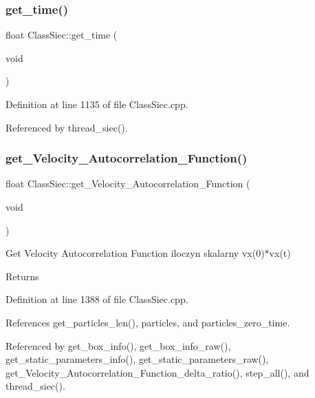 \subsubsection{\texorpdfstring{get\+\_\+time()}{get\_time()}}
{\footnotesize\ttfamily float Class\+Siec\+::get\+\_\+time (\begin{DoxyParamCaption}\item[{void}]{ }\end{DoxyParamCaption})}



Definition at line 1135 of file Class\+Siec.\+cpp.



Referenced by thread\+\_\+siec().

\mbox{\label{classClassSiec_acffa9f63d7236490d4e214a59e443140}} 
\subsubsection{\texorpdfstring{get\+\_\+\+Velocity\+\_\+\+Autocorrelation\+\_\+\+Function()}{get\_Velocity\_Autocorrelation\_Function()}}
{\footnotesize\ttfamily float Class\+Siec\+::get\+\_\+\+Velocity\+\_\+\+Autocorrelation\+\_\+\+Function (\begin{DoxyParamCaption}\item[{void}]{ }\end{DoxyParamCaption})}

Get Velocity Autocorrelation Function iloczyn skalarny vx(0)$\ast$vx(t) \begin{DoxyReturn}{Returns}

\end{DoxyReturn}


Definition at line 1388 of file Class\+Siec.\+cpp.



References get\+\_\+particles\+\_\+len(), particles, and particles\+\_\+zero\+\_\+time.



Referenced by get\+\_\+box\+\_\+info(), get\+\_\+box\+\_\+info\+\_\+raw(), get\+\_\+static\+\_\+parameters\+\_\+info(), get\+\_\+static\+\_\+parameters\+\_\+raw(), get\+\_\+\+Velocity\+\_\+\+Autocorrelation\+\_\+\+Function\+\_\+delta\+\_\+ratio(), step\+\_\+all(), and thread\+\_\+siec().


